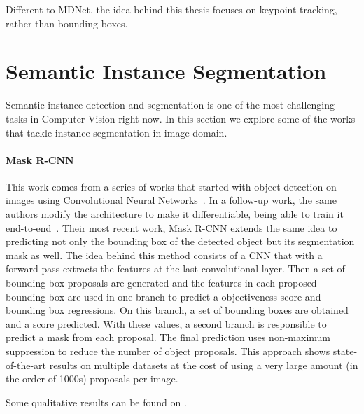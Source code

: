 Different to MDNet, the idea behind this thesis focuses on keypoint tracking, rather than bounding boxes.



\section{Semantic Instance Segmentation}
\label{sec:stateofart:semanticinstancesegmentation}

Semantic instance detection and segmentation is one of the most challenging tasks in Computer Vision right now.
In this section we explore some of the works that tackle instance segmentation in image domain.


\paragraph{Mask R-CNN~\maskrcnn{}}
This work comes from a series of works that started with object detection on images using Convolutional Neural Networks~\fastrcnn{}.
In a follow-up work, the same authors modify the architecture to make it differentiable, being able to train it end-to-end~\fasterrcnn{}.
Their most recent work, Mask R-CNN extends the same idea to predicting not only the bounding box of the detected object but its segmentation mask as well.
The idea behind this method consists of a CNN that with a forward pass extracts the features at the last convolutional layer.
Then a set of bounding box proposals are generated and the features in each proposed bounding box are used in one branch to predict a objectiveness score and bounding box regressions.
On this branch, a set of bounding boxes are obtained and a score predicted.
With these values, a second branch is responsible to predict a mask from each proposal.
The final prediction uses non-maximum suppression to reduce the number of object proposals.
This approach shows state-of-the-art results on multiple datasets at the cost of using a very large amount (in the order of 1000s) proposals per image.

Some qualitative results can be found on .

